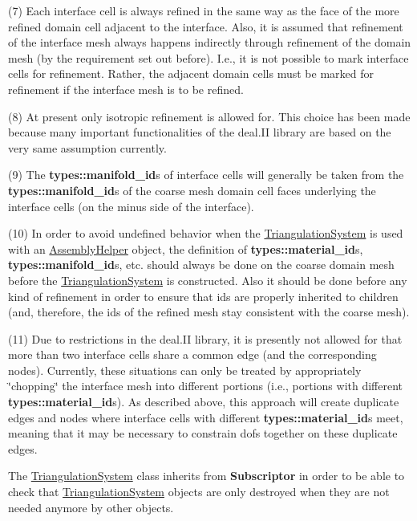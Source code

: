(7) Each interface cell is always refined in the same way as the face of the more refined domain cell adjacent to the interface. Also, it is assumed that refinement of the interface mesh always happens indirectly through refinement of the domain mesh (by the requirement set out before). I.\+e., it is not possible to mark interface cells for refinement. Rather, the adjacent domain cells must be marked for refinement if the interface mesh is to be refined.

(8) At present only isotropic refinement is allowed for. This choice has been made because many important functionalities of the deal.\+II library are based on the very same assumption currently.

(9) The {\bf types\+::manifold\+\_\+id}s of interface cells will generally be taken from the {\bf types\+::manifold\+\_\+id}s of the coarse mesh domain cell faces underlying the interface cells (on the minus side of the interface).

(10) In order to avoid undefined behavior when the \hyperlink{class_triangulation_system}{Triangulation\+System} is used with an \hyperlink{class_assembly_helper}{Assembly\+Helper} object, the definition of {\bf types\+::material\+\_\+id}s, {\bf types\+::manifold\+\_\+id}s, etc. should always be done on the coarse domain mesh before the \hyperlink{class_triangulation_system}{Triangulation\+System} is constructed. Also it should be done before any kind of refinement in order to ensure that ids are properly inherited to children (and, therefore, the ids of the refined mesh stay consistent with the coarse mesh).

(11) Due to restrictions in the deal.\+II library, it is presently not allowed for that more than two interface cells share a common edge (and the corresponding nodes). Currently, these situations can only be treated by appropriately \char`\"{}chopping\char`\"{} the interface mesh into different portions (i.\+e., portions with different {\bf types\+::material\+\_\+id}s). As described above, this approach will create duplicate edges and nodes where interface cells with different {\bf types\+::material\+\_\+id}s meet, meaning that it may be necessary to constrain dofs together on these duplicate edges.

The \hyperlink{class_triangulation_system}{Triangulation\+System} class inherits from {\bf Subscriptor} in order to be able to check that \hyperlink{class_triangulation_system}{Triangulation\+System} objects are only destroyed when they are not needed anymore by other objects.


